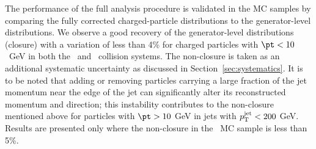 The performance of the full analysis procedure is validated in the MC samples by comparing the fully corrected charged-particle distributions to the generator-level distributions.
We observe a good recovery of the generator-level distributions (closure) with a variation of less than 4\% for charged particles with \mbox{$\pt < 10$ GeV} in both the \pp\ and \pbpb\ collision systems.
The non-closure is taken as an additional systematic uncertainty as discussed in Section~\ref{sec:systematics}.
It is to be noted that adding or removing particles carrying a large fraction of the jet momentum near the edge of the jet can significantly alter its reconstructed momentum and direction; this instability contributes to the non-closure mentioned above for particles with $\pt > 10$ GeV in jets with $\mbox{$p_{\mathrm{T}}^{\mathrm{jet}}$} < 200$ GeV.
Results are presented only where the non-closure in the \pp\ MC sample is less than 5\%.


